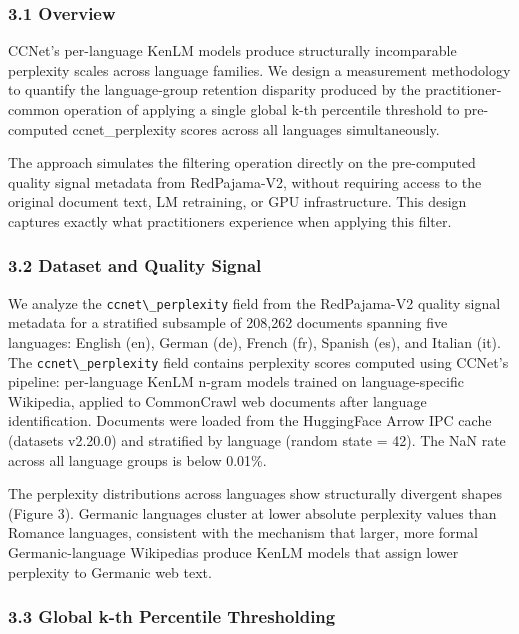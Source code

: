 
\subsubsection{3.1 Overview}

CCNet's per-language KenLM models produce structurally incomparable perplexity scales across language families. We design a measurement methodology to quantify the language-group retention disparity produced by the practitioner-common operation of applying a single global k-th percentile threshold to pre-computed ccnet\_perplexity scores across all languages simultaneously.

The approach simulates the filtering operation directly on the pre-computed quality signal metadata from RedPajama-V2, without requiring access to the original document text, LM retraining, or GPU infrastructure. This design captures exactly what practitioners experience when applying this filter.

\subsubsection{3.2 Dataset and Quality Signal}

We analyze the \texttt{ccnet\textbackslash \_perplexity} field from the RedPajama-V2 quality signal metadata for a stratified subsample of 208,262 documents spanning five languages: English (en), German (de), French (fr), Spanish (es), and Italian (it). The \texttt{ccnet\textbackslash \_perplexity} field contains perplexity scores computed using CCNet's pipeline: per-language KenLM n-gram models trained on language-specific Wikipedia, applied to CommonCrawl web documents after language identification. Documents were loaded from the HuggingFace Arrow IPC cache (datasets v2.20.0) and stratified by language (random state = 42). The NaN rate across all language groups is below 0.01\%.

The perplexity distributions across languages show structurally divergent shapes (Figure 3). Germanic languages cluster at lower absolute perplexity values than Romance languages, consistent with the mechanism that larger, more formal Germanic-language Wikipedias produce KenLM models that assign lower perplexity to Germanic web text.

\subsubsection{3.3 Global k-th Percentile Thresholding}

